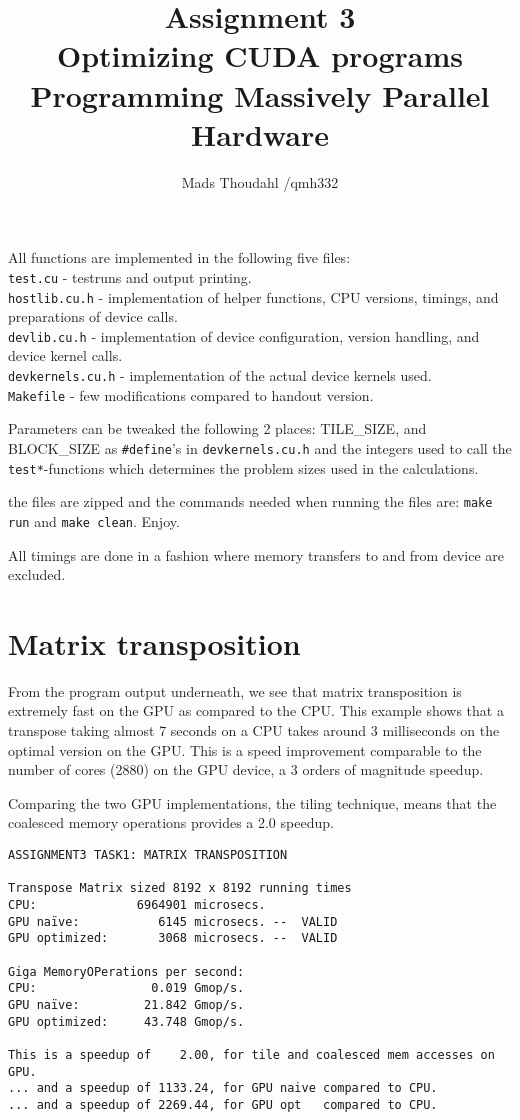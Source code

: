 \documentclass[a4paper,10pt]{article}
\title{Assignment 3 \\ Optimizing CUDA programs \\Programming Massively Parallel Hardware }
\author{Mads Thoudahl /qmh332}
\begin{document}
\maketitle

\vfill

All functions are implemented in the following five files: \\
\texttt{test.cu} - testruns and output printing. \\
\texttt{hostlib.cu.h} - implementation of helper functions, CPU versions, timings, and preparations of device calls. \\
\texttt{devlib.cu.h} - implementation of device configuration, version handling, and device kernel calls. \\
\texttt{devkernels.cu.h} - implementation of the actual device kernels used. \\
\texttt{Makefile} - few modifications compared to handout version.

Parameters can be tweaked the following 2 places: TILE\_SIZE, and BLOCK\_SIZE as \texttt{\#define}'s in \texttt{devkernels.cu.h} and the integers used to call the \texttt{test*}-functions which determines the problem sizes used in the calculations.

the files are zipped and the commands needed when running the files are:
\texttt{make run} and \texttt{make clean}. Enjoy.

All timings are done in a fashion where memory transfers to and from device are excluded.

\vfill
\section{Matrix transposition}

From the program output underneath, we see that matrix transposition is extremely fast on the GPU as compared to the CPU. 
This example shows that a transpose taking almost 7 seconds on a CPU takes around 3 milliseconds on the optimal version on the GPU.
This is a speed improvement comparable to the number of cores (2880) on the GPU device, a 3 orders of magnitude speedup.

Comparing the two GPU implementations, the tiling technique, means that the coalesced memory operations provides a 2.0 speedup.

\vfill

\begin{verbatim}
ASSIGNMENT3 TASK1: MATRIX TRANSPOSITION

Transpose Matrix sized 8192 x 8192 running times
CPU:              6964901 microsecs. 
GPU naïve:           6145 microsecs. --  VALID
GPU optimized:       3068 microsecs. --  VALID

Giga MemoryOPerations per second:
CPU:                0.019 Gmop/s.
GPU naïve:         21.842 Gmop/s.
GPU optimized:     43.748 Gmop/s.

This is a speedup of    2.00, for tile and coalesced mem accesses on GPU.
... and a speedup of 1133.24, for GPU naive compared to CPU.
... and a speedup of 2269.44, for GPU opt   compared to CPU.
\end{verbatim}
\end{document}
